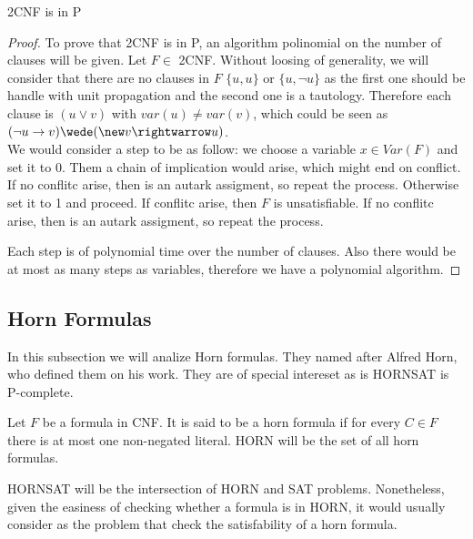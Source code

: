 \begin{proposition}
  2CNF is in P 
\end{proposition}
\begin{proof}

  To prove that 2CNF is in P, an algorithm polinomial on the number of clauses will be given. Let $F \in$ 2CNF.  Without loosing of generality, we will consider that there are no clauses in $F$ $\{u,u\}$ or $\{u,\neg u\}$ as the first one should be handle with unit propagation and the second one is a tautology. Therefore each clause is $(u \vee v)$ with $var(u) \ne var(v)$, which could be seen as $(\neg u \rightarrow v) \wede (\new v \rightwarrow u)$.\\


  
  We would consider a step to be as follow: we choose a variable $x \in Var(F)$ and set it to 0. Them a chain of implication would arise, which might end on conflict. If no conflitc arise, then is an autark assigment, so repeat the process. Otherwise set it to 1 and proceed. If conflitc arise, then $F$ is unsatisfiable. If no conflitc arise, then is an autark assigment, so repeat the process.
  

  Each step is of polynomial time over the number of clauses. Also there would be at most as many steps as variables, therefore we have a polynomial algorithm.
  
  
\end{proof}

\subsection{Horn Formulas}

In this subsection we will analize Horn formulas. They named after Alfred Horn, who defined them on his work\cite{horn1951sentences}. They are of special intereset as is HORNSAT is P-complete.


\begin{definition}
  Let $F$ be a formula in CNF. It is said to be a horn formula if for every $C \in F$ there is at most one non-negated literal. HORN will be the set of all horn formulas.

  HORNSAT will be the intersection of HORN and SAT problems. Nonetheless, given the easiness of checking whether a formula is in HORN, it would usually consider as the problem that check the satisfability of a horn formula.
\end{definition}


